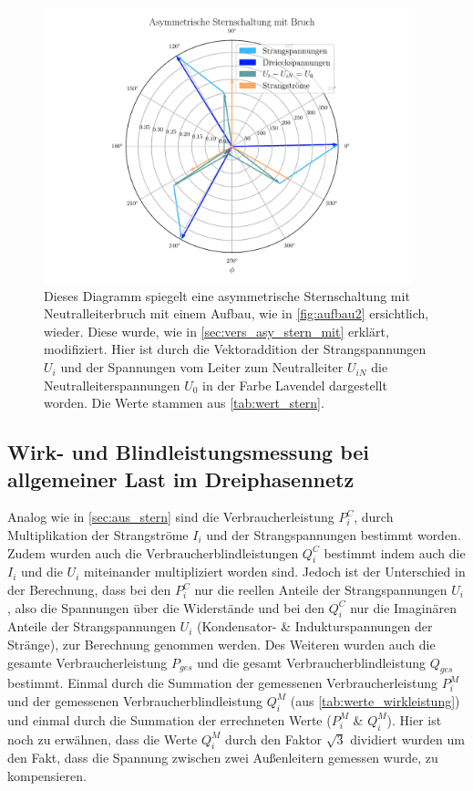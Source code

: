 \documentclass[12pt,english,ngerman]{scrartcl}
\begin{document}
\begin{figure}[H]
	\begin{center}
		\includegraphics[width = 0.95\textwidth]{figures/zeigerSternAsymBruch.pdf}
	\end{center}
	\caption[Zeigerdiagramm einer asymmetrisch ohmsch-belastete Sternschaltung mit
		Neutralleiterbruch]{Dieses Diagramm spiegelt eine asymmetrische Sternschaltung
		mit Neutralleiterbruch mit einem Aufbau, wie in \autoref{fig:aufbau2}
		ersichtlich, wieder. Diese wurde, wie in \autoref{sec:vers_asy_stern_mit}
		erklärt, modifiziert. Hier ist durch die Vektoraddition der Strangspannungen
		$U_i$ und der Spannungen vom Leiter zum Neutralleiter $U_{iN}$ die
		Neutralleiterspannungen $U_0$ in der Farbe Lavendel dargestellt worden. Die
		Werte stammen aus \autoref{tab:wert_stern}.
	}\label{fig:zeigerSternAsymBruch}
\end{figure}

\subsection{Wirk- und Blindleistungsmessung bei allgemeiner Last im Dreiphasennetz}

Analog wie in \autoref{sec:aus_stern} sind die Verbraucherleistung $P_i^C$,
durch Multiplikation der Strangströme $I_i$ und der Strangspannungen bestimmt
worden. Zudem wurden auch die Verbraucherblindleistungen $Q_i^C$ bestimmt indem
auch die $I_i$ und die $U_i$ miteinander multipliziert worden sind. Jedoch ist
der Unterschied in der Berechnung, dass bei den $P_i^C$ nur die reellen Anteile
der Strangspannungen $U_i$, also die Spannungen über die Widerstände und bei
den $Q_i^C$ nur die Imaginären Anteile der Strangspannungen $U_i$ (Kondensator-
\& Indukturspannungen der Stränge), zur Berechnung genommen werden. Des
Weiteren wurden auch die gesamte Verbraucherleistung $P_{ges}$ und die gesamt
Verbraucherblindleistung $Q_{ges}$ bestimmt. Einmal durch die Summation der
gemessenen Verbraucherleistung $P_i^M$ und der gemessenen
Verbraucherblindleistung $Q_i^M$ (aus \autoref{tab:werte_wirkleistung}) und
einmal durch die Summation der errechneten Werte ($P_i^M$ \& $Q_i^M$). Hier ist
noch zu erwähnen, dass die Werte $Q_i^M$ durch den Faktor $\sqrt{3}$ dividiert
wurden um den Fakt, dass die Spannung zwischen zwei Außenleitern gemessen wurde,
zu kompensieren.
\end{document}
